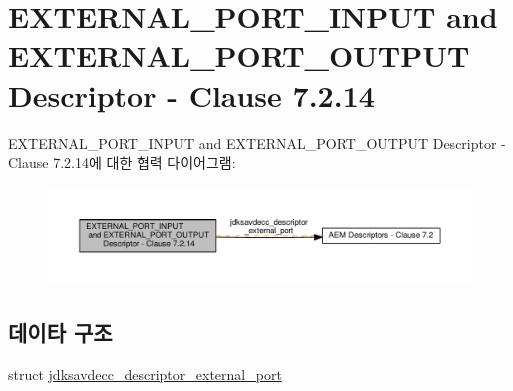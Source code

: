 \hypertarget{group__descriptor__external__port}{}\section{E\+X\+T\+E\+R\+N\+A\+L\+\_\+\+P\+O\+R\+T\+\_\+\+I\+N\+P\+UT and E\+X\+T\+E\+R\+N\+A\+L\+\_\+\+P\+O\+R\+T\+\_\+\+O\+U\+T\+P\+UT Descriptor -\/ Clause 7.2.14}
\label{group__descriptor__external__port}
E\+X\+T\+E\+R\+N\+A\+L\+\_\+\+P\+O\+R\+T\+\_\+\+I\+N\+P\+UT and E\+X\+T\+E\+R\+N\+A\+L\+\_\+\+P\+O\+R\+T\+\_\+\+O\+U\+T\+P\+UT Descriptor -\/ Clause 7.2.14에 대한 협력 다이어그램\+:
\nopagebreak
\begin{figure}[H]
\begin{center}
\leavevmode
\includegraphics[width=350pt]{group__descriptor__external__port}
\end{center}
\end{figure}
\subsection*{데이타 구조}
\begin{DoxyCompactItemize}
\item 
struct \hyperlink{structjdksavdecc__descriptor__external__port}{jdksavdecc\+\_\+descriptor\+\_\+external\+\_\+port}
\end{DoxyCompactItemize}

